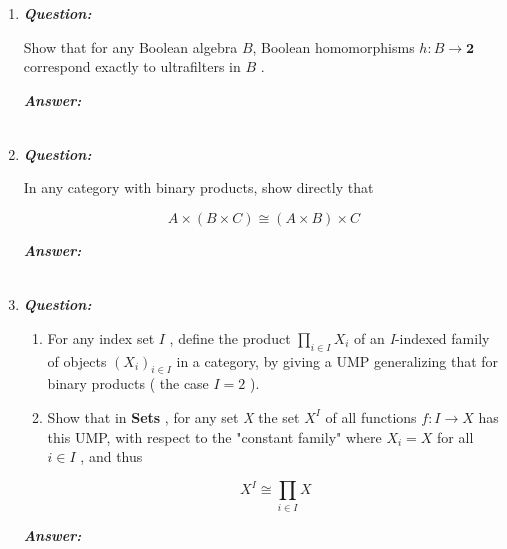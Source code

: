 \documentclass{article}
\begin{document}
\begin{enumerate}
	\item
	      \textbf{\textit{Question:}}

	      Show that for any Boolean algebra $ B $, Boolean homomorphisms $ h : B \to \textbf{2}  $ correspond exactly to ultrafilters in $ B $ .

	      \textbf{\textit{Answer:}}

	      \begin{align*}
	      \end{align*}


	\item
	      \textbf{\textit{Question:}}

	      In any category with binary products, show directly that

	      \begin{displaymath}
		      A \times (B \times C) \cong (A \times B) \times C
	      \end{displaymath}


	      \textbf{\textit{Answer:}}

	      \begin{align*}
	      \end{align*}


	\item
	      \textbf{\textit{Question:}}

	      \begin{enumerate}
		      \item For any index set $ I $ , define the product $ \prod_{i \in I} X_i $ of an \textit{I}-indexed family of objects $ (X_i)_{i \in I} $ in a category, by giving a UMP  generalizing that for binary products ( the case $ I = 2 $ ).

		      \item Show that in \textbf{Sets} , for any set \textit{X} the set $ X^I $ of all functions $ f : I \to X $ has this UMP, with respect to the "constant family" where $ X_i = X $ for all $ i \in I $ , and thus

		            \begin{displaymath}
			            X^I \cong \prod_{i \in I} X
		            \end{displaymath}



	      \end{enumerate}

	      \textbf{\textit{Answer:}}

	      \begin{align*}
	      \end{align*}



\end{enumerate}
\end{document}
